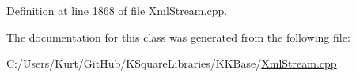 Definition at line 1868 of file Xml\+Stream.\+cpp.



The documentation for this class was generated from the following file\+:\begin{DoxyCompactItemize}
\item 
C\+:/\+Users/\+Kurt/\+Git\+Hub/\+K\+Square\+Libraries/\+K\+K\+Base/\hyperlink{_xml_stream_8cpp}{Xml\+Stream.\+cpp}\end{DoxyCompactItemize}
